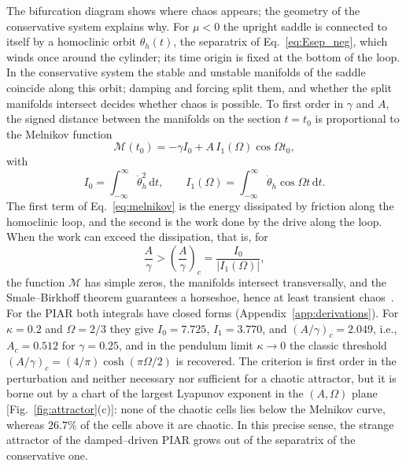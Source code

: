 The bifurcation diagram shows where chaos appears; the geometry of the conservative system explains why. For $\mu<0$ the upright saddle is connected to itself by a homoclinic orbit $\theta_h(t)$, the separatrix of Eq.~\eqref{eq:Esep_neg}, which winds once around the cylinder; its time origin is fixed at the bottom of the loop. In the conservative system the stable and unstable manifolds of the saddle coincide along this orbit; damping and forcing split them, and whether the split manifolds intersect decides whether chaos is possible. To first order in $\gamma$ and $A$, the signed distance between the manifolds on the section $t=t_0$ is proportional to the Melnikov function~\cite{Melnikov1963,GuckenheimerHolmes1983}
\begin{equation}
\mathcal M(t_0) = -\gamma I_0 + A\,I_1(\Omega)\cos\Omega t_0,
\label{eq:melnikov}
\end{equation}
with
\begin{equation}
I_0 = \int_{-\infty}^{\infty}\dot\theta_h^{2}\,\mathrm dt,\qquad
I_1(\Omega) = \int_{-\infty}^{\infty}\dot\theta_h\cos\Omega t\,\mathrm dt .
\label{eq:melnikov_integrals}
\end{equation}
The first term of Eq.~\eqref{eq:melnikov} is the energy dissipated by friction along the homoclinic loop, and the second is the work done by the drive along the loop. When the work can exceed the dissipation, that is, for
\begin{equation}
\frac{A}{\gamma} > \left(\frac{A}{\gamma}\right)_{\!c} = \frac{I_0}{|I_1(\Omega)|},
\label{eq:melnikov_threshold}
\end{equation}
the function $\mathcal M$ has simple zeros, the manifolds intersect transversally, and the Smale--Birkhoff theorem guarantees a horseshoe, hence at least transient chaos~\cite{GuckenheimerHolmes1983}. For the PIAR both integrals have closed forms (Appendix~\ref{app:derivations}). For $\kappa=0.2$ and $\Omega=2/3$ they give $I_0=7.725$, $I_1=3.770$, and $(A/\gamma)_c=2.049$, i.e., $A_c=0.512$ for $\gamma=0.25$, and in the pendulum limit $\kappa\to0$ the classic threshold $(A/\gamma)_c=(4/\pi)\cosh(\pi\Omega/2)$ is recovered. The criterion is first order in the perturbation and neither necessary nor sufficient for a chaotic attractor, but it is borne out by a chart of the largest Lyapunov exponent in the $(A,\Omega)$ plane [Fig.~\ref{fig:attractor}(c)]: none of the chaotic cells lies below the Melnikov curve, whereas $26.7\%$ of the cells above it are chaotic. In this precise sense, the strange attractor of the damped--driven PIAR grows out of the separatrix of the conservative one.

